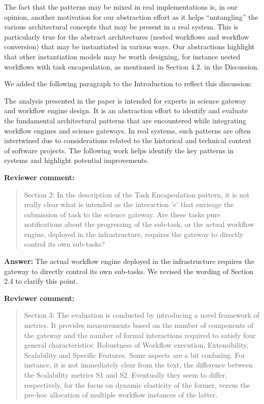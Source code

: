 \documentclass[a4]{letter}
\newenvironment{review}%
{\textbf{Reviewer comment:}\begin{quote}}%
{\end{quote}}%
\newcommand{\answer}[1]{\textbf{Answer:} #1}
\newcommand{\revised}[1]{\color{blue} #1\color{black}}
\begin{document}
\begin{letter}{}
{  The fact that the patterns may be mixed in real implementations is,
  in our opinion, another motivation for our abstraction effort as it
  helps ``untangling'' the various architectural concepts that may be
  present in a real system. This is particularly true for the abstract
  architectures (nested workflows and workflow conversion) that may be
  instantiated in various ways. Our abstractions highlight that other
  instantiation models may be worth designing, for instance nested
  workflows with task encapsulation, as mentioned in Section 4.2. in
  the Discussion.

  We added the following paragraph to the Introduction to reflect this discussion:}

\revised{The analysis presented in the paper is intended for
experts in science gateway and workflow engine design. It is an
abstraction effort to identify and evaluate the fundamental
architectural patterns that are encountered while integrating workflow
engines and science gateways. In real systems, such patterns are often
intertwined due to considerations related to the historical and
technical context of software projects. The following work helps
identify the key patterns in systems and highlight potential
improvements.}


\begin{review}
  Section 2: In the description of the Task Encapsulation pattern, it
  is not really clear what is intended as the interaction 'e' that
  envisage the submission of task to the science gateway. Are these
  tasks pure notifications about the progressing of the sub-task, or
  the actual workflow engine, deployed in the infrastructure, requires
  the gateway to directly control its own sub-tasks?
\end{review}

\answer{The actual workflow engine deployed in the infrastructure
  requires the gateway to directly control its own sub-tasks. We
  revised the wording of Section 2.4 to clarify this point.}

\begin{review}
  Section 3: The evaluation is conducted by introducing a novel
  framework of metrics. It provides measurements based on the number
  of components of the gateway and the number of formal interactions
  required to satisfy four general characteristics: Robustness of
  Workflow execution, Extensibility, Scalability and Specific
  Features. Some aspects are a bit confusing. For instance, it is not
  immediately clear from the text, the difference between the
  Scalability metrics S1 and S2. Eventually they seem to differ,
  respectively, for the focus on dynamic elasticity of the former,
  versus the pre-hoc allocation of multiple workflow instances of the
  latter.
\end{review}


\end{letter}
\end{document}
